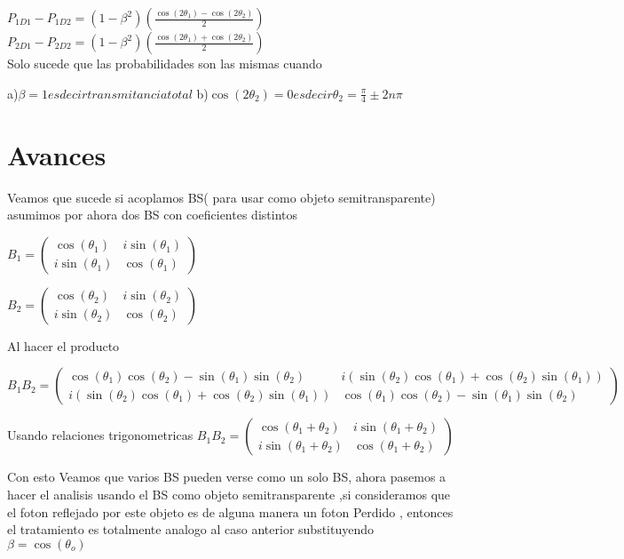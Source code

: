 \documentclass[11pt]{article}
\begin{document}
$P_{1D1}-P_{1D2}=(1-\beta^2)(\frac{\cos(2 \theta_{1})-\cos(2 \theta_{2})}{2})$\\

$P_{2D1}-P_{2D2}=(1-\beta^2)(\frac{\cos(2 \theta_{1})+\cos(2 \theta_{2})}{2})$\\

Solo sucede que las probabilidades son las mismas cuando

a)$\beta=1 es decir transmitancia total $
b)$\cos(2 \theta_{2})=0 es decir \theta_{2}=\frac{\pi}{4}\pm 2n\pi$
\section{Avances}

Veamos que sucede si acoplamos BS( para usar como objeto semitransparente) asumimos por ahora dos BS con coeficientes distintos



$B_{1}=\begin{pmatrix} \cos(\theta_{1}) & i \sin(\theta_{1}) \\ i \sin(\theta_{1}) & \cos(\theta_{1}) \end{pmatrix}$

$B_{2}=\begin{pmatrix} \cos(\theta_{2}) & i \sin(\theta_{2}) \\ i \sin(\theta_{2}) & \cos(\theta_{2}) \end{pmatrix}$

Al hacer el producto

$B_{1}B_{2}= \begin{pmatrix} \cos(\theta_{1})\cos(\theta_{2})-\sin(\theta_{1})\sin(\theta_{2})& i (\sin(\theta_{2})\cos(\theta_{1})+\cos(\theta_{2})\sin(\theta_{1})) \\ i (\sin(\theta_{2})\cos(\theta_{1})+\cos(\theta_{2})\sin(\theta_{1})) & \cos(\theta_{1})\cos(\theta_{2})-\sin(\theta_{1})\sin(\theta_{2}) \end{pmatrix} $

Usando relaciones trigonometricas 
$B_{1}B_{2}=\begin{pmatrix} \cos(\theta_{1}+\theta_{2}) & i \sin(\theta_{1}+\theta_{2}) \\ i \sin(\theta_{1}+\theta_{2}) & \cos(\theta_{1}+\theta_{2}) \end{pmatrix}$


Con esto Veamos que varios BS pueden verse como un solo BS, ahora pasemos a hacer el analisis usando el BS como objeto semitransparente ,si consideramos que el foton reflejado por este objeto es de alguna manera un foton Perdido , entonces el tratamiento es totalmente analogo al caso anterior substituyendo $\beta=\cos(\theta_{o})$
\end{document}
